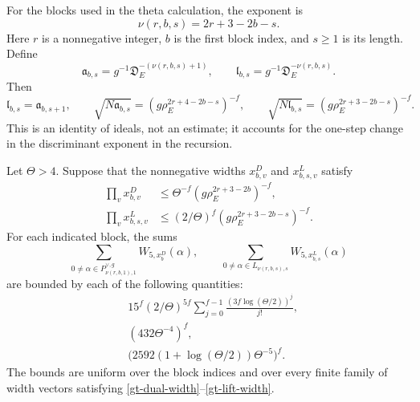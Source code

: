 For the blocks used in the theta calculation, the exponent is
\begin{equation}\label{gt-block-exponent}
 \nu(r,b,s)=2r+3-2b-s.
\end{equation}
Here $r$ is a nonnegative integer, $b$ is the first block index, and
$s\geq1$ is its length.  Define
\[
 \mathfrak a_{b,s}=g^{-1}\mathfrak D_E^{-(\nu(r,b,s)+1)},
 \qquad
 \mathfrak l_{b,s}=g^{-1}\mathfrak D_E^{-\nu(r,b,s)}.
\]
Then
\begin{equation}\label{gt-adjacent-ideals}
 \mathfrak l_{b,s}=\mathfrak a_{b,s+1},\qquad
 \sqrt{N\mathfrak a_{b,s}}
    =(g\rho_E^{2r+4-2b-s})^{-f},\qquad
 \sqrt{N\mathfrak l_{b,s}}
    =(g\rho_E^{2r+3-2b-s})^{-f}.
\end{equation}
This is an identity of ideals, not an estimate; it accounts for the
one-step change in the discriminant exponent in the recursion.

\begin{corollary}\label{gt-actual-error}
Let $\Theta>4$.  Suppose that the nonnegative widths
$x^{D}_{b,v}$ and $x^{L}_{b,s,v}$ satisfy
\begin{align}
 \prod_vx^{D}_{b,v}
       &\leq\Theta^{-f}(g\rho_E^{2r+3-2b})^{-f},
                 \label{gt-dual-width}\\
 \prod_vx^{L}_{b,s,v}
       &\leq(2/\Theta)^f
                       (g\rho_E^{2r+3-2b-s})^{-f}.
                 \label{gt-lift-width}
\end{align}
For each indicated block, the sums
\begin{equation}\label{gt-actual-sums}
 \sum_{0\ne\alpha\in P_{\nu(r,b,1),1}^{\vee,g}}
                  W_{5,x^D_b}(\alpha),
 \qquad
 \sum_{0\ne\alpha\in L_{\nu(r,b,s),s}}
                  W_{5,x^L_{b,s}}(\alpha)
\end{equation}
are bounded by each of the following quantities:
\begin{align}
 &15^f(2/\Theta)^{5f}
       \sum_{j=0}^{f-1}
                  \frac{(3f\log(\Theta/2))^j}{j!},
                  \label{gt-error-exact}\\
 &(432\Theta^{-4})^f,
                  \label{gt-error-simple}\\
 &\bigl(2592(1+\log(\Theta/2))\Theta^{-5}\bigr)^f.
                  \label{gt-error-log}
\end{align}
The bounds are uniform over the block indices and over every finite
family of width vectors satisfying
\eqref{gt-dual-width}--\eqref{gt-lift-width}.
\end{corollary}

